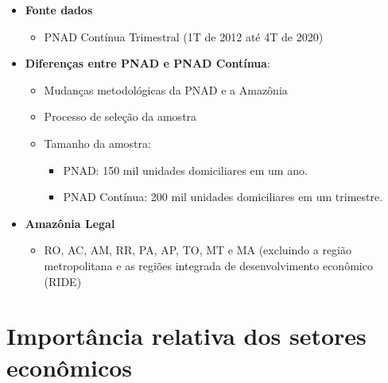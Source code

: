\documentclass[8pt]{beamer}
\begin{document}
\begin{frame}{}

\begin{itemize}
	\item{\textbf{Fonte dados}
			\begin{itemize}
			\item{{\footnotesize PNAD Contínua Trimestral (1T de 2012 até 4T de 2020)}}
			\end{itemize}					
		}	
		\vspace{2mm}
	\item{\textbf{Diferenças entre PNAD e PNAD Contínua}:		
		\begin{itemize}
			\item{{\footnotesize Mudanças metodológicas da PNAD e a Amazônia}}
			\item{{\footnotesize Processo de seleção da amostra}}
			\item{{\footnotesize Tamanho da amostra:}
				\begin{itemize}
				 	\item{{\scriptsize PNAD: 150 mil unidades domiciliares em um ano.}}
				 	\item{{\scriptsize PNAD Contínua: 200 mil unidades domiciliares em um trimestre.}}
				\end{itemize}
			}
		\end{itemize}					
		}
		\vspace{2mm}

	\item{\textbf{Amazônia Legal}
			\begin{itemize}
			\item{{\footnotesize RO, AC, AM, RR, PA, AP, TO, MT e MA (excluindo a região metropolitana e as regiões integrada de desenvolvimento econômico (RIDE)}}
			\end{itemize}					
		}
\end{itemize}

\end{frame}


\section{Importância relativa dos setores econômicos}
\end{document}
